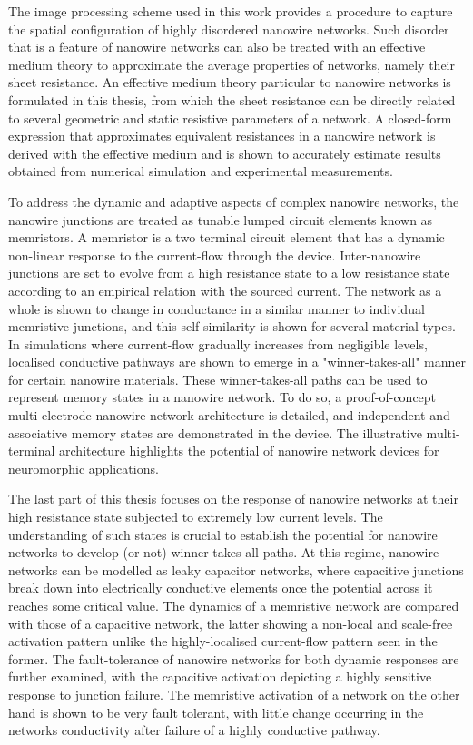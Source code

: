 The image processing scheme used in this work provides a procedure to capture the spatial configuration of highly disordered nanowire networks. Such disorder that is a feature of nanowire networks can also be treated with an effective medium theory to approximate the average properties of networks, namely their sheet resistance. An effective medium theory particular to nanowire networks is formulated in this thesis, from which the sheet resistance can be directly related to several geometric and static resistive parameters of a network. A closed-form expression that approximates equivalent resistances in a nanowire network is derived with the effective medium and is shown to accurately estimate results obtained from numerical simulation and experimental measurements.

To address the dynamic and adaptive aspects of complex nanowire networks, the nanowire junctions are treated as tunable lumped circuit elements known as memristors. A memristor is a two terminal circuit element that has a dynamic non-linear response to the current-flow through the device. Inter-nanowire junctions are set to evolve from a high resistance state to a low resistance state according to an empirical relation with the sourced current. The network as a whole is shown to change in conductance in a similar manner to individual memristive junctions, and this self-similarity is shown for several material types. In simulations where current-flow gradually increases from negligible levels, localised conductive pathways are shown to emerge in a "winner-takes-all" manner for certain nanowire materials. 
These winner-takes-all paths can be used to represent memory states in a nanowire network. To do so, a proof-of-concept multi-electrode nanowire network architecture is detailed, and independent and associative memory states are demonstrated in the device. The illustrative multi-terminal architecture highlights the potential of nanowire network devices for neuromorphic applications.

The last part of this thesis focuses on the response of nanowire networks at their high resistance state subjected to extremely low current levels. The understanding of such states is crucial to establish the potential for nanowire networks to develop (or not) winner-takes-all paths. At this regime, nanowire networks can be modelled as leaky capacitor networks, where capacitive junctions break down into electrically conductive elements once the potential across it reaches some critical value. The dynamics of a memristive network are compared with those of a capacitive network, the latter showing a non-local and scale-free activation pattern unlike the highly-localised current-flow pattern seen in the former. The fault-tolerance of nanowire networks for both dynamic responses are further examined, with the capacitive activation depicting a highly sensitive response to junction failure. The memristive activation of a network on the other hand is shown to be very fault tolerant, with little change occurring in the networks conductivity after failure of a highly conductive pathway.



\endgroup			

\vfill
